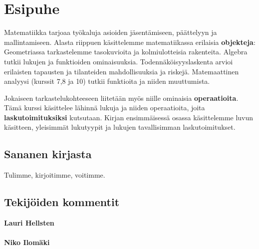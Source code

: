 


\chapter{Esipuhe}



Matematiikka tarjoaa työkaluja asioiden jäsentämiseen, päättelyyn ja mallintamiseen. Alasta riippuen käsittelemme matematiikassa erilaisia \textbf{objekteja}: Geometriassa tarkastelemme tasokuvioita ja kolmiulotteisia rakenteita. Algebra tutkii lukujen ja funktioiden ominaisuuksia. Todennäköisyyslaskenta arvioi erilaisten tapausten ja tilanteiden mahdollisuuksia ja riskejä. Matemaattinen analyysi (kurssit 7,8 ja 10) tutkii funktioita ja niiden muuttumista.

Jokaiseen tarkastelukohteeseen liitetään myös niille ominaisia \textbf{operaatioita}. Tämä kurssi käsittelee lähinnä lukuja ja niiden operaatioita, joita \textbf{laskutoimituksiksi} kutsutaan. Kirjan ensimmäisessä osassa käsittelemme luvun käsitteen, yleisimmät lukutyypit ja lukujen tavallisimman laskutoimitukset.

\section*{Sananen kirjasta}

Tulimme, kirjoitimme, voitimme.

\section*{Tekijöiden kommentit}


\textbf{Lauri Hellsten}\\

\\
\textbf{Niko Ilomäki}\\

